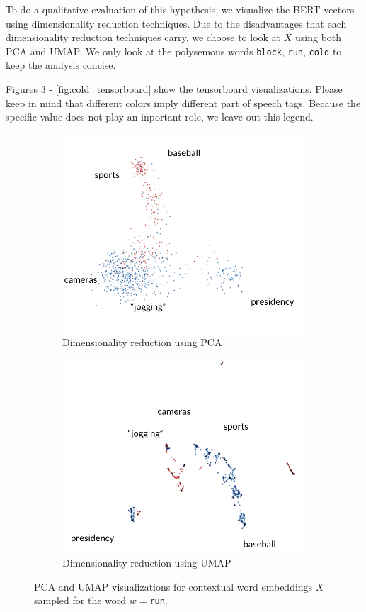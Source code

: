 \documentclass[a4paper,12pt,oneside,openright]{report}
\begin{document}
To do a qualitative evaluation of this hypothesis, we visualize the BERT vectors using dimensionality reduction techniques.
Due to the disadvantages that each dimensionality reduction techniques carry, we choose to look at $X$ using both PCA and UMAP.
We only look at the polysemous words \Verb#block#, \Verb#run#, \Verb#cold# to keep the analysis concise.

Figures \ref{fig:run_tensorboard} - \ref{fig:cold_tensorboard} show  the tensorboard visualizations.
Please keep in mind that different colors imply different part of speech tags. 
Because the specific value does not play an inportant role, we leave out this legend.

\begin{figure}[H]
\begin{subfigure}{.45\textwidth}
  \centering
  \includegraphics[width=.8\linewidth]{./assets/analysis/run_pca.png}
  \caption{Dimensionality reduction using PCA}
  \label{fig:sfig1}
\end{subfigure}%
\hfill
\begin{subfigure}{.45\textwidth}
  \centering
  \includegraphics[width=.8\linewidth]{./assets/analysis/run_umap.png}
  \caption{Dimensionality reduction using UMAP}
  \label{fig:sfig2}
\end{subfigure}
\caption{PCA and UMAP visualizations for contextual word embeddings $X$ sampled for the word $w=$\texttt{run}. }
\label{fig:run_tensorboard}
\end{figure}
\end{document}
